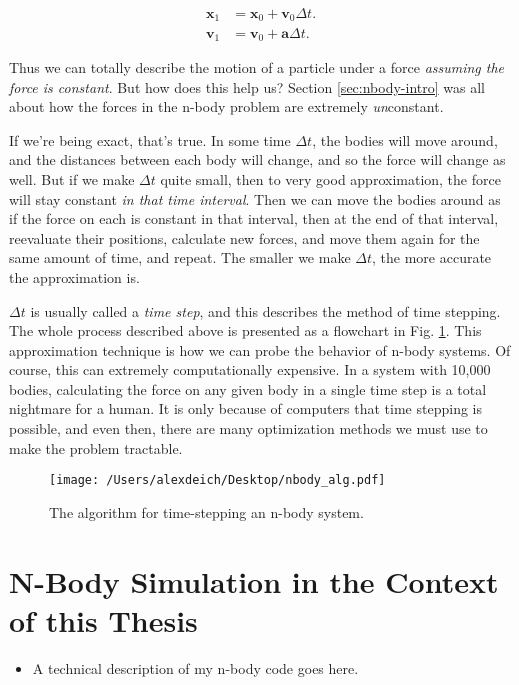 \documentclass[11pt]{article}
\begin{document}
\begin{align*}
\mathbf{x}_1&=\mathbf{x}_0 + \mathbf{v}_0 \Delta t.\\
\mathbf{v}_1&=\mathbf{v}_0 + \mathbf{a} \Delta t.
\end{align*}

Thus we can totally describe the motion of a particle under a force \emph{assuming the force is constant}.  But how does this help us?  Section \ref{sec:nbody-intro} was all about how the forces in the n-body problem are extremely \emph{un}constant.  

If we're being exact, that's true.  In some time $\Delta t$, the bodies will move around, and the distances between each body will change, and so the force will change as well.  But if we make $\Delta t$ quite small, then to very good approximation, the force will stay constant \emph{in that time interval}.  Then we can move the bodies around as if the force on each is constant in that interval, then at the end of that interval, reevaluate their positions, calculate new forces, and move them again for the same amount of time, and repeat.   The smaller we make $\Delta t$, the more accurate the approximation is.

$\Delta t$ is usually called a \emph{time step}, and this describes the method of time stepping.  The whole process described above is presented as a flowchart in Fig. \ref{fig:nbody_flow}.  This approximation technique is how we can probe the behavior of n-body systems.  Of course, this can extremely computationally expensive.  In a system with 10,000 bodies, calculating the force on any given body in a single time step is a total nightmare for a human.  It is only because of computers that time stepping is possible, and even then, there are many optimization methods we must use to make the problem tractable.
\begin{figure}[ht]
\begin{center}
\texttt{[image: /Users/alexdeich/Desktop/nbody\_alg.pdf]}
\caption{The algorithm for time-stepping an n-body system.}
\label{fig:nbody_flow}
\end{center}
\end{figure}

\section{N-Body Simulation in the Context of this Thesis}
\begin{itemize}
\item A technical description of my n-body code goes here.
\end{itemize}
\end{document}
